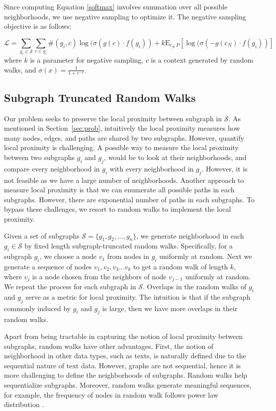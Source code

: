 \documentclass[sigconf]{acmart}
\newcommand{\s}{\mathcal{S}}
\begin{document}
Since computing Equation \ref{softmax} involves summation over all possible neighborhoods, we use negative sampling to optimize it.
The negative sampling objective is as follows:

{
\small
\begin{equation}
\label{obj:ns}
\mathcal{L} = \sum_{g_i \in \s} \sum_{c \in g_i} \#(g_i, c) \log( \sigma( g(c) \cdot f(g_i)) + k  \mathrm{E}_{c_N ~ P}[\log( \sigma( -  g(c_N) \cdot f(g_i))]
\end{equation}
}
where $k$ is a parameter for negative sampling, $c$ is a context generated by random walks, and $\sigma(x) = \frac{1}{1+ e^{-x}}$.

\subsection{Subgraph Truncated Random Walks}
\label{sec:nei}
Our problem seeks to preserve the local proximity between subgraph in $\s$. As mentioned in Section~\ref{sec:prob}, intuitively the local proximity measures how many nodes, edges, and paths are shared by two subgraphs. However, quantify local proximity is challenging.
A possible way to measure the local proximity between two subgraphs $g_i$ and $g_j$, would be to look at their neighborhoods, and compare every neighborhood in $g_i$ with every neighborhood in $g_j$. However, it is not feasible as we have a large number of neighborhoods. Another approach to measure local proximity is that we can enumerate all possible paths in each subgraphs. However, there are exponential number of paths in each subgraphs. To bypass these challenges, we resort to random walks to implement the local proximity. 

Given a set of subgraphs $\s = \{g_1,g_2, \dots, g_n \}$, we generate neighborhood in each $g_i \in \s$ by fixed length subgraph-truncated random walks. Specifically, for a subgraph $g_i$, we choose a node $v_1$ from nodes in $g_i$ uniformly at random. Next we generate a sequence of nodes  $v_1, v_2, v_3 \dots v_k$ to get a random walk of length $k$, where $v_j$ is a node chosen from the neighbors of node $v_{j-1}$ uniformly at random. We repeat the process for each subgraph in $\s$. Overlaps in the random walks of $g_i$ and $g_j$ serve as a metric for local proximity. The intuition is that if the subgraph commonly induced by $g_i$ and $g_j$ is large, then we have more overlaps in their random walks.

Apart from being tractable in capturing the notion of local proximity between subgraphs, random walks have other advantages. First, the notion of neighborhood in other data types, such as texts, is naturally defined due to the sequential nature of text data. However, graphs are not sequential, hence  it is more challenging to define the neighborhoods of subgraphs. Random walks help sequentialize subgraphs. Moreover, 
random walks generate meaningful sequences, for example, the frequency of nodes in random walk follows power law distribution \cite{perozzi2014deepwalk}.
\end{document}
